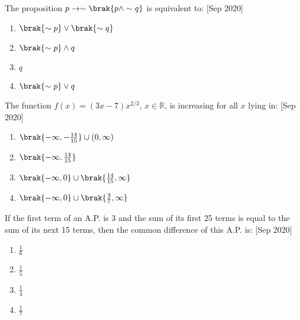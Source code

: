     \item The proposition $ p \to \sim\brak{p \land \sim q} $ is equivalent to:
    \hfill{[Sep 2020]}
    \begin{enumerate}
        \item $ \brak{\sim p} \lor \brak{\sim q} $
        \item $ \brak{\sim p} \land q $
        \item $ q $
        \item $ \brak{\sim p} \lor q $
    \end{enumerate}

    \item The function $ f(x) = (3x - 7)x^{2/3} $, $ x \in \mathbb{R} $, is increasing for all $ x $ lying in:
    \hfill{[Sep 2020]}
    \begin{enumerate}
        \item $ \brak{ -\infty, -\frac{14}{15} } \cup (0, \infty) $
        \item $ \brak{ -\infty, \frac{14}{15} } $
        \item $ \brak{ -\infty, 0 } \cup \brak{ \frac{14}{15}, \infty } $
        \item $ \brak{ -\infty, 0} \cup \brak{ \frac{3}{7}, \infty } $
    \end{enumerate}

    \item If the first term of an A.P. is 3 and the sum of its first 25 terms is equal to the sum of its next 15 terms, then the common difference of this A.P. is:
    \hfill{[Sep 2020]}
    \begin{enumerate}
        \item $ \frac{1}{6} $
        \item $ \frac{1}{5} $
        \item $ \frac{1}{4} $
        \item $ \frac{1}{7} $
    \end{enumerate}



